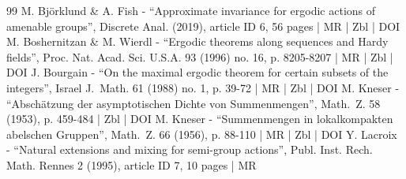 \begin{thebibliography}{99}
M. Björklund \& A. Fish - “Approximate invariance for ergodic actions of amenable groups”, Discrete Anal. (2019), article ID 6, 56 pages | MR | Zbl | DOI
M. Boshernitzan \& M. Wierdl - “Ergodic theorems along sequences and Hardy fields”, Proc. Nat. Acad. Sci. U.S.A. 93 (1996) no. 16, p. 8205-8207 | MR | Zbl | DOI
J. Bourgain - “On the maximal ergodic theorem for certain subsets of the integers”, Israel J. Math. 61 (1988) no. 1, p. 39-72 | MR | Zbl | DOI
M. Kneser - “Abschätzung der asymptotischen Dichte von Summenmengen”, Math. Z. 58 (1953), p. 459-484 | Zbl | DOI
M. Kneser - “Summenmengen in lokalkompakten abelschen Gruppen”, Math. Z. 66 (1956), p. 88-110 | MR | Zbl | DOI
Y. Lacroix - “Natural extensions and mixing for semi-group actions”, Publ. Inst. Rech. Math. Rennes 2 (1995), article ID 7, 10 pages | MR
\end{thebibliography}
